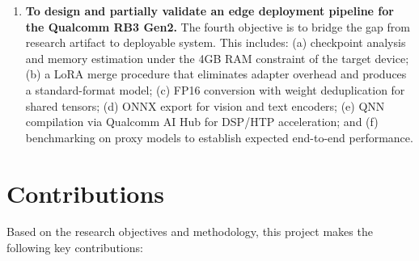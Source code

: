 \documentclass[../main.tex]{subfiles}
\begin{document}
\begin{enumerate}
    \item \textbf{To design and partially validate an edge deployment pipeline for the Qualcomm RB3 Gen2.} The fourth objective is to bridge the gap from research artifact to deployable system. This includes: (a) checkpoint analysis and memory estimation under the 4GB RAM constraint of the target device; (b) a LoRA merge procedure that eliminates adapter overhead and produces a standard-format model; (c) FP16 conversion with weight deduplication for shared tensors; (d) ONNX export for vision and text encoders; (e) QNN compilation via Qualcomm AI Hub for DSP/HTP acceleration; and (f) benchmarking on proxy models to establish expected end-to-end performance.
\end{enumerate}

\section{Contributions}
\label{sec:contributions}

Based on the research objectives and methodology, this project makes the following key contributions:
\end{document}
